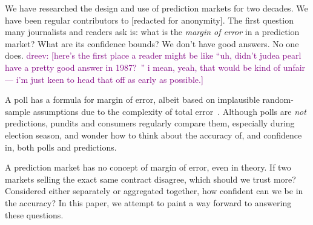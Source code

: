 \documentclass[sigconf,anonymous]{aamas}   %
\newcommand{\dreev} [1]{\ifnum\Chatty=1 \textcolor{purple}{dreev:  [#1]} \fi}
\begin{document}
We have researched the design and use of prediction markets for two decades. 
We have been regular contributors to [redacted for anonymity].
The first question many journalists and readers ask is: what is the \textit{margin of error} in a prediction market? What are its confidence bounds?
We don't have good answers. No one does.
\dreev{here's the first place a reader might be like ``uh, didn't judea pearl have a pretty good answer in 1987?~\cite{pearl1987}'' i mean, yeah, that would be kind of unfair --- i'm just keen to head that off as early as possible.}

A poll has a formula for margin of error,  albeit based on implausible random-sample assumptions due to the complexity of total error~\cite{shirani2018disentangling}. Although polls are \textit{not} predictions, pundits and consumers regularly compare them, especially during election season, and wonder how to think about the accuracy of, and confidence in, both polls and predictions.

A prediction market has no concept of margin of error, even in theory.
If two markets selling the exact same contract disagree, which should we trust more?
Considered either separately or aggregated together, how confident can we be in the accuracy? In this paper, we attempt to paint a way forward to answering these questions.
\end{document}
